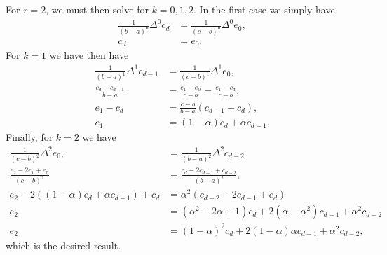 \begin{solution}
    For $r = 2$, we must then solve for $k = 0, 1, 2$.
    In the first case we simply have
    \begin{align*}
        \frac{1}{(b - a)^0} \Delta^0 c_d &= \frac{1}{(c - b)^0} \Delta^0 e_0, \\
        c_d &= e_0.
    \end{align*}
    For $k = 1$ we have then have
    \begin{align*}
        \frac{1}{(b - a)^1} \Delta^1 c_{d - 1} &= \frac{1}{(c - b)^1} \Delta^1 e_0, \\
        \frac{c_d - c_{d-1}}{b - a} &= \frac{e_1 - e_0}{c - b} = \frac{e_1 - c_d}{c - b}, \\
        e_1 - c_d &= \frac{c - b}{b - a} (c_{d-1} - c_d), \\
        e_1 &= (1 - \alpha) c_d + \alpha c_{d-1}.
    \end{align*}
    Finally, for $k = 2$ we have
    \begin{align*}
        \frac{1}{(c - b)^2} \Delta^2 e_0, &= \frac{1}{(b - a)^2} \Delta^2 c_{d - 2} \\
        \frac{e_2 - 2 e_1 + e_0}{(c-b)^2} &= \frac{c_{d} - 2 c_{d-1} + c_{d-2}}{(b-a)^2}, \\
        e_2 - 2 \left( (1 - \alpha) c_d + \alpha c_{d-1} \right) + c_d &= \alpha^2 \left( c_{d-2} - 2 c_{d-1} + c_d \right) \\
        e_2 &= \left( \alpha^2 - 2 \alpha + 1 \right) c_d + 2 \left( \alpha - \alpha^2 \right) c_{d-1} + \alpha^2 c_{d-2} \\
        e_2 &= (1 - \alpha)^2 c_d + 2(1 - \alpha) \alpha c_{d-1} + \alpha^2 c_{d-2},
    \end{align*}
    which is the desired result.
\end{solution}